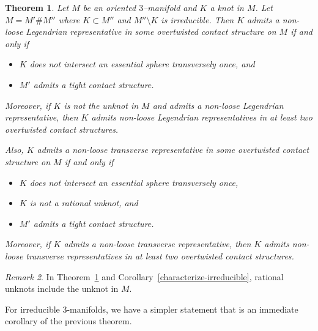 \documentclass[11pt]{amsart}
\theoremstyle{plain}
\newtheorem{theorem}{Theorem}
\theoremstyle{definition}
\theoremstyle{remark}
\newtheorem{remark}[theorem]{Remark}
\numberwithin{theorem}{section}
\begin{document}
\begin{theorem}\label{characterize}
  Let $M$ be an oriented $3$--manifold and $K$ a knot in $M$. Let $M = M' \# M''$ where $K \subset M''$ and $M'' \setminus K$ is irreducible. Then $K$ admits a non-loose Legendrian representative in some overtwisted contact structure on $M$ if and only if 

  \begin{itemize}
    \item $K$ does not intersect an essential sphere transversely once, and
    \item $M'$ admits a tight contact structure.
  \end{itemize}

  Moreover, if $K$ is not the unknot in $M$ and admits a non-loose Legendrian representative, then $K$ admits non-loose Legendrian representatives in at least two overtwisted contact structures. 

  Also, $K$ admits a non-loose transverse representative in some overtwisted contact structure on $M$ if and only if 
  \begin{itemize}
    \item $K$ does not intersect an essential sphere transversely once, 
    \item $K$ is not a rational unknot, and   
    \item $M'$ admits a tight contact structure.
  \end{itemize}

  Moreover, if $K$ admits a non-loose transverse representative, then $K$ admits non-loose transverse representatives in at least two overtwisted contact structures. 
\end{theorem}

\begin{remark}
  In Theorem~\ref{characterize} and Corollary~\ref{characterize-irreducible}, rational unknots include the unknot in $M$.
\end{remark}

For irreducible $3$-manifolds, we have a simpler statement that is an immediate corollary of the previous theorem.
\end{document}
